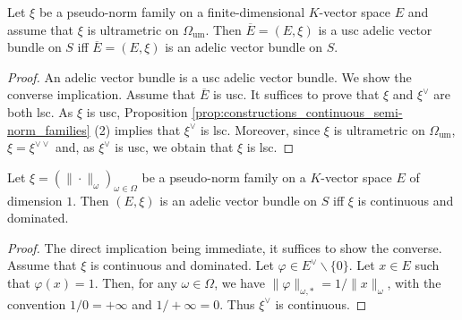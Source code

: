 \documentclass [11pt,reqno]{amsart}
\newcommand{\1}{\mathmybb{1}}
\def\um{\operatorname{um}}
\def\setminus{\smallsetminus}
\begin{document}
\begin{proposition}
\label{prop:comparaison_usc_adeli_vector_bundle}
Let $\xi$ be a pseudo-norm family on a finite-dimensional $K$-vector space $E$ and assume that $\xi$ is ultrametric on $\Omega_{\um}$. Then $\overline{E}=(E,\xi)$ is a usc adelic vector bundle on $S$ iff $\overline{E}=(E,\xi)$ is an adelic vector bundle on $S$. 
\end{proposition}

\begin{proof}
An adelic vector bundle is a usc adelic vector bundle. We show the converse implication. Assume that $\overline{E}$ is usc. It suffices to prove that $\xi$ and $\xi^{\vee}$ are both lsc. As $\xi$ is usc, Proposition \ref{prop:constructions_continuous_semi-norm_families} (2) implies that $\xi^{\vee}$ is lsc. Moreover, since $\xi$ is ultrametric on $\Omega_{\um}$, $\xi=\xi^{\vee\vee}$ and, as $\xi^{\vee}$ is usc, we obtain that $\xi$ is lsc.
\end{proof}

\begin{proposition}
\label{prop:adelic_line_bundle_tac}
Let $\xi=(\|\cdot\|_{\omega})_{\omega\in\Omega}$ be a pseudo-norm family on a $K$-vector space $E$ of dimension $1$. Then $(E,\xi)$ is an adelic vector bundle on $S$ iff $\xi$ is continuous and dominated.
\end{proposition}

\begin{proof}
The direct implication being immediate, it suffices to show the converse. Assume that $\xi$ is continuous and dominated. Let $\varphi\in E^{\vee} \setminus\{0\}$. Let $x\in E$ such that $\varphi(x)=1$. Then, for any $\omega\in\Omega$, we have $\|\varphi\|_{\omega,\ast}=1/\|x\|_{\omega}$, with the convention $1/0=+\infty$ and $1/+\infty=0$. Thus $\xi^{\vee}$ is continuous.
\end{proof}
\end{document}

